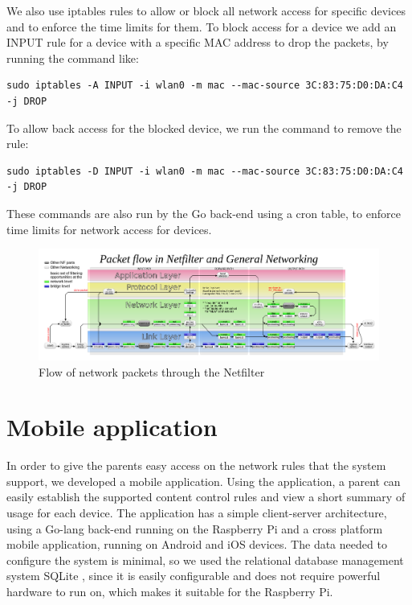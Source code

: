 We also use iptables rules to allow or block all network access for specific devices and to enforce the time limits for them. To block access for a device we add an INPUT rule for a device with a specific MAC address to drop the packets, by running the command like:

\begin{lstlisting}
sudo iptables -A INPUT -i wlan0 -m mac --mac-source 3C:83:75:D0:DA:C4 -j DROP
\end{lstlisting}

To allow back access for the blocked device, we run the command to remove the rule:

\begin{lstlisting}
sudo iptables -D INPUT -i wlan0 -m mac --mac-source 3C:83:75:D0:DA:C4 -j DROP
\end{lstlisting}

These commands are also run by the Go back-end using a cron table, to enforce time limits for network access for devices.

\begin{figure}[th]
\centering
\includegraphics[width=1\textwidth]{Figures/netfilter-flow}
\decoRule
\caption{Flow of network packets through the Netfilter}
\label{fig:netfilter-flow}
\end{figure}

\section{Mobile application}

In order to give the parents easy access on the network rules that the system support, we developed a mobile application.
Using the application, a parent can easily establish the supported content control rules and view a short summary of usage for each device. The application has a simple client-server architecture, using a Go-lang back-end running on the Raspberry Pi and a cross platform mobile application, running on Android and iOS devices. The data needed to configure the system is minimal, so we used the relational database management system SQLite \citep{sqlite}, since it is easily configurable and does not require powerful hardware to run on, which makes it suitable for the Raspberry Pi. 


